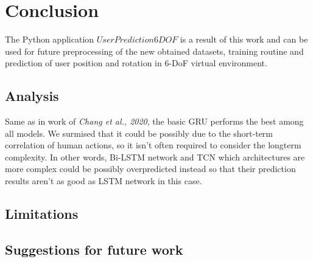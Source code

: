 \chapter{Conclusion}
\label{sec:conclusion}
The Python application $UserPrediction6DOF$ is a result of this work and can be used for future preprocessing of the new obtained datasets, training routine and prediction of user position and rotation in 6-DoF virtual environment. 

\section{Analysis}
\label{sec:conclusion:analysis}
Same as in work of \textit{Chang et al., 2020}, the basic GRU performs the best among all models. We surmised that it could be possibly due to the short-term correlation of human actions, so it isn’t often required to consider the longterm complexity. In other words, Bi-LSTM network and TCN which architectures are more complex could be possibly overpredicted instead so that their prediction results aren’t as good as LSTM network in this case.


\section{Limitations}
\label{sec:conclusion:limitations}

\section{Suggestions for future work}
\label{sec:conclusion:future}

